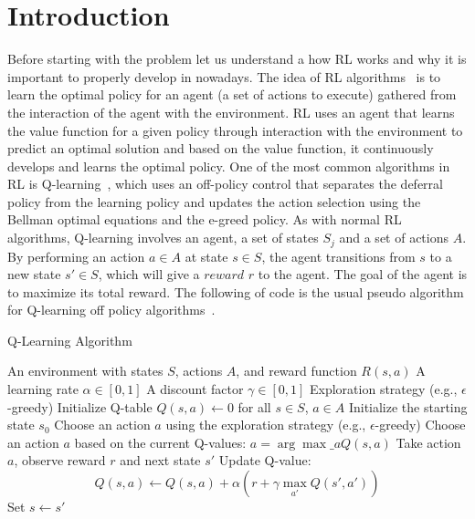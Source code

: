 
\section{Introduction}
\label{sec:problem}

Before starting with the problem let us understand a how \ac{RL} works and why it is  
important to properly develop in nowadays.
The idea of \ac{RL} algorithms~\cite{sutton18} is to learn the optimal policy for an agent (a set of actions to execute) gathered from the interaction of the agent with the environment. \ac{RL} uses an agent that learns the value function for a given policy 
through interaction with the environment to predict an optimal solution and based on the value 
function, it continuously develops and learns the optimal policy. One of the most common algorithms
in \ac{RL} is Q-learning~\cite{beakcheol19}, which uses an off-policy control that separates the deferral 
policy from the learning policy and updates the action selection using the Bellman optimal equations
and the e-greed policy. As with normal \ac{RL} algorithms, Q-learning involves an agent, a set of states
$S_j$ and a set of actions $A$. By performing an action $a\in A$ at state $s \in S$, the agent 
transitions from $s$ to a new state $s' \in S$, which will give a $reward$ $r$ to the agent. 
The goal of the agent is to maximize its total reward. The following  of code is the usual pseudo algorithm for  Q-learning off policy algorithms~\cite{sutton18}.

\begin{algorithm}
\caption{Q-Learning Algorithm}\label{lst:qlearning}
\begin{algorithmic}
\Require An environment with states $S$, actions $A$, and reward function $R(s, a)$
\Require A learning rate $\alpha \in [0, 1]$
\Require A discount factor $\gamma \in [0, 1]$
\Require Exploration strategy (e.g., $\epsilon$-greedy)
\State Initialize Q-table $Q(s, a) \gets 0$ for all $s \in S$, $a \in A$
    \State Initialize the starting state $s_0$
            \State Choose an action $a$ using the exploration strategy (e.g., $\epsilon$-greedy)
        \Else
            \State Choose an action $a$ based on the current Q-values: $a = \arg\max\_a Q(s, a)$
        \EndIf
        \State Take action $a$, observe reward $r$ and next state $s'$
        \State Update Q-value: 
        \[
        Q(s, a) \gets Q(s, a) + \alpha \left( r + \gamma \max_{a'} Q(s', a')\right)
        \]
        \State Set $s \gets s'$
    \EndFor
\EndFor
\end{algorithmic}
\end{algorithm}

